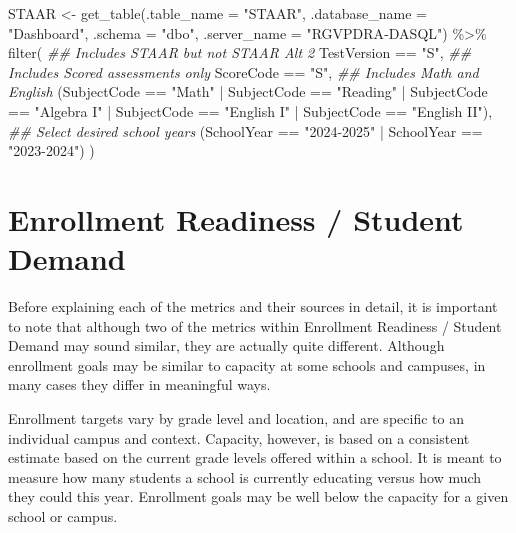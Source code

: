 \documentclass[
  letterpaper,
  DIV=11,
  numbers=noendperiod]{scrreprt}
\newenvironment{Shaded}{\begin{snugshade}}{\end{snugshade}}
\newcommand{\AttributeTok}[1]{\textcolor[rgb]{0.40,0.45,0.13}{#1}}
\newcommand{\DocumentationTok}[1]{\textcolor[rgb]{0.37,0.37,0.37}{\textit{#1}}}
\newcommand{\FunctionTok}[1]{\textcolor[rgb]{0.28,0.35,0.67}{#1}}
\newcommand{\NormalTok}[1]{\textcolor[rgb]{0.00,0.23,0.31}{#1}}
\newcommand{\OtherTok}[1]{\textcolor[rgb]{0.00,0.23,0.31}{#1}}
\newcommand{\SpecialCharTok}[1]{\textcolor[rgb]{0.37,0.37,0.37}{#1}}
\newcommand{\StringTok}[1]{\textcolor[rgb]{0.13,0.47,0.30}{#1}}
\begin{document}
\begin{Shaded}
\begin{Highlighting}[]
\NormalTok{STAAR }\OtherTok{\textless{}{-}} \FunctionTok{get\_table}\NormalTok{(}\AttributeTok{.table\_name =} \StringTok{"STAAR"}\NormalTok{, }\AttributeTok{.database\_name =} \StringTok{"Dashboard"}\NormalTok{,}
                   \AttributeTok{.schema =} \StringTok{"dbo"}\NormalTok{, }\AttributeTok{.server\_name =} \StringTok{"RGVPDRA{-}DASQL"}\NormalTok{) }\SpecialCharTok{\%\textgreater{}\%}
  \FunctionTok{filter}\NormalTok{(}
    \DocumentationTok{\#\# Includes STAAR but not STAAR Alt 2 }
\NormalTok{      TestVersion }\SpecialCharTok{==} \StringTok{"S"}\NormalTok{, }
    \DocumentationTok{\#\# Includes Scored assessments only}
\NormalTok{      ScoreCode }\SpecialCharTok{==} \StringTok{"S"}\NormalTok{, }
    \DocumentationTok{\#\# Includes Math and English }
\NormalTok{    (SubjectCode }\SpecialCharTok{==} \StringTok{"Math"} \SpecialCharTok{|}
\NormalTok{     SubjectCode }\SpecialCharTok{==} \StringTok{"Reading"} \SpecialCharTok{|}
\NormalTok{     SubjectCode }\SpecialCharTok{==} \StringTok{"Algebra I"} \SpecialCharTok{|}
\NormalTok{     SubjectCode }\SpecialCharTok{==} \StringTok{"English I"} \SpecialCharTok{|}
\NormalTok{     SubjectCode }\SpecialCharTok{==} \StringTok{"English II"}\NormalTok{),}
    \DocumentationTok{\#\# Select desired school years}
\NormalTok{    (SchoolYear }\SpecialCharTok{==} \StringTok{"2024{-}2025"} \SpecialCharTok{|}
\NormalTok{     SchoolYear }\SpecialCharTok{==} \StringTok{"2023{-}2024"}\NormalTok{)}
\NormalTok{  )}
\end{Highlighting}
\end{Shaded}


\chapter{Enrollment Readiness / Student Demand}\label{sec-06Enroll}

Before explaining each of the metrics and their sources in detail, it is
important to note that although two of the metrics within Enrollment
Readiness / Student Demand may sound similar, they are actually quite
different. Although enrollment goals may be similar to capacity at some
schools and campuses, in many cases they differ in meaningful ways.

Enrollment targets vary by grade level and location, and are specific to
an individual campus and context. Capacity, however, is based on a
consistent estimate based on the current grade levels offered within a
school. It is meant to measure how many students a school is currently
educating versus how much they could this year. Enrollment goals may be
well below the capacity for a given school or campus.
\end{document}
